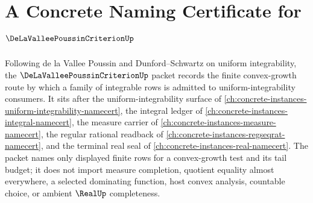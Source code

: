 \chapter{A Concrete Naming Certificate for $\DeLaValleePoussinCriterionUp$}
\label{ch:concrete-instances-de-la-vallee-poussin-criterion-namecert}

Following de la Vallee Poussin and Dunford--Schwartz on uniform integrability, the $\DeLaValleePoussinCriterionUp$ packet records the finite convex-growth route by which a family of integrable rows is admitted to uniform-integrability consumers. It sits after the uniform-integrability surface of \autoref{ch:concrete-instances-uniform-integrability-namecert}, the integral ledger of \autoref{ch:concrete-instances-integral-namecert}, the measure carrier of \autoref{ch:concrete-instances-measure-namecert}, the regular rational readback of \autoref{ch:concrete-instances-regseqrat-namecert}, and the terminal real seal of \autoref{ch:concrete-instances-real-namecert}. The packet names only displayed finite rows for a convex-growth test and its tail budget; it does not import measure completion, quotient equality almost everywhere, a selected dominating function, host convex analysis, countable choice, or ambient $\RealUp$ completeness.

